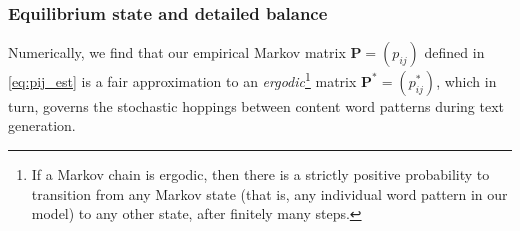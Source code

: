 \documentclass[10pt,journal,compsoc]{IEEEtran}
\begin{document}
\subsubsection{Equilibrium state and detailed balance}Numerically,  we find that  our empirical Markov matrix $  \mathbf{ P}=( p_{ij})$ defined in \eqref{eq:pij_est} is a fair approximation to an \textit{ergodic}\footnote{If a Markov chain is  ergodic,  then there is a strictly positive probability to transition from any Markov state (that is, any individual word pattern in our model) to any other state, after finitely many steps.} matrix $ \mathbf P^{*}=( p_{ij}^{*})$, which in turn, governs the stochastic hoppings between content word patterns  during text generation.
\begin{figure}
\vspace{2em}

\hspace{-2.39em}\begin{minipage}{0.125\textwidth}
\vspace{-1.78em}


\end{minipage}
\end{figure}
\end{document}
